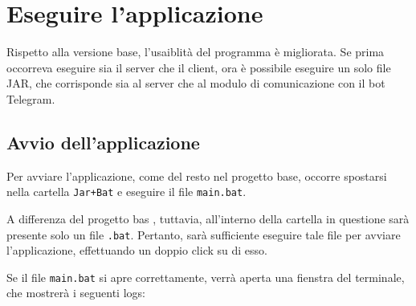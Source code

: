 \section{Eseguire l'applicazione}

Rispetto alla versione base, l'usaiblità del programma è migliorata. Se prima occorreva eseguire sia il server che il client, ora è possibile eseguire un solo file JAR, che corrisponde sia al server che al modulo di comunicazione con il bot Telegram. 

\subsection{Avvio dell'applicazione}

Per avviare l'applicazione, come del resto nel progetto base, occorre spostarsi nella cartella \texttt{Jar+Bat} e eseguire il file \texttt{main.bat}. 

A differenza del progetto bas , tuttavia, all'interno della cartella in questione sarà presente solo un file \texttt{.bat}. Pertanto, sarà sufficiente eseguire tale file per avviare l'applicazione, effettuando un doppio click su di esso.

Se il file \texttt{main.bat} si apre correttamente, verrà aperta una fienstra del terminale, che mostrerà i seguenti logs: 

